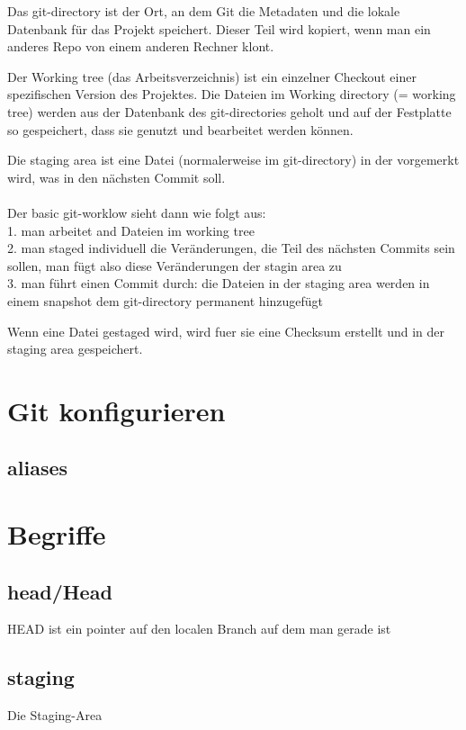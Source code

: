 \documentclass{article}
\begin{document}
Das git-directory ist der Ort, an dem Git die Metadaten und die lokale Datenbank für das Projekt speichert. Dieser Teil wird kopiert, wenn man ein anderes Repo von einem anderen Rechner klont.

Der Working tree (das Arbeitsverzeichnis) ist ein einzelner Checkout einer spezifischen Version des Projektes. Die Dateien im Working directory (= working tree) werden aus der Datenbank des git-directories geholt und auf der Festplatte so gespeichert, dass sie genutzt und bearbeitet werden können.

Die staging area ist eine Datei (normalerweise im git-directory) in der vorgemerkt wird, was in den nächsten Commit soll. \\ \\
Der basic git-worklow sieht dann wie folgt aus:\\
1. man arbeitet and Dateien im working tree\\
2. man staged individuell die Veränderungen, die Teil des nächsten Commits sein sollen, man fügt also diese Veränderungen der stagin area zu\\
3. man führt einen Commit durch: die Dateien in der staging area werden in einem snapshot dem git-directory permanent hinzugefügt

Wenn eine Datei gestaged wird, wird fuer sie eine Checksum erstellt und in der staging area gespeichert.

\section*{Git konfigurieren}

\subsection*{aliases}

\section*{Begriffe}
\subsection*{head/Head}

HEAD ist ein pointer auf den localen Branch auf dem man gerade ist

\subsection*{staging}
Die Staging-Area 
\end{document}
